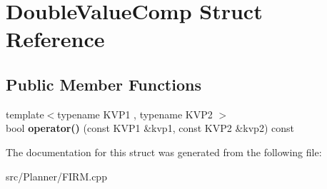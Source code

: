 \hypertarget{struct_double_value_comp}{\section{\-Double\-Value\-Comp \-Struct \-Reference}
\label{struct_double_value_comp}
}
\subsection*{\-Public \-Member \-Functions}
\begin{DoxyCompactItemize}
\item 
\hypertarget{struct_double_value_comp_ac6d9c50d9d2897ff6c452c71114d585e}{{\footnotesize template$<$typename K\-V\-P1 , typename K\-V\-P2 $>$ }\\bool {\bfseries operator()} (const \-K\-V\-P1 \&kvp1, const \-K\-V\-P2 \&kvp2) const }\label{struct_double_value_comp_ac6d9c50d9d2897ff6c452c71114d585e}

\end{DoxyCompactItemize}


\-The documentation for this struct was generated from the following file\-:\begin{DoxyCompactItemize}
\item 
src/\-Planner/\-F\-I\-R\-M.\-cpp\end{DoxyCompactItemize}
